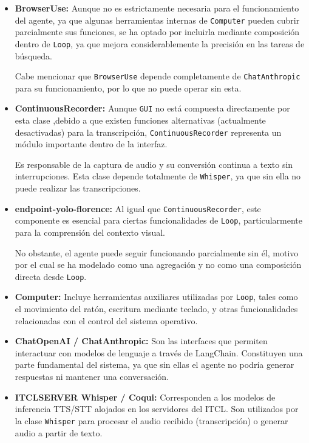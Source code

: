 \begin{itemize}
    \item \textbf{BrowserUse:} Aunque no es estrictamente necesaria para el funcionamiento del agente, ya que algunas herramientas internas de \texttt{Computer} pueden cubrir parcialmente sus funciones, se ha optado por incluirla mediante composición dentro de \texttt{Loop}, ya que mejora considerablemente la precisión en las tareas de búsqueda.
    
    Cabe mencionar que \texttt{BrowserUse} depende completamente de \texttt{ChatAnthropic} para su funcionamiento, por lo que no puede operar sin esta.

    \item \textbf{ContinuousRecorder:} Aunque \texttt{GUI} no está compuesta directamente por esta clase ,debido a que existen funciones alternativas (actualmente desactivadas) para la transcripción, \texttt{ContinuousRecorder} representa un módulo importante dentro de la interfaz.
    
    Es responsable de la captura de audio y su conversión continua a texto sin interrupciones. Esta clase depende totalmente de \texttt{Whisper}, ya que sin ella no puede realizar las transcripciones.

    \item \textbf{endpoint-yolo-florence:} Al igual que \texttt{ContinuousRecorder}, este componente es esencial para ciertas funcionalidades de \texttt{Loop}, particularmente para la comprensión del contexto visual.
    
    No obstante, el agente puede seguir funcionando parcialmente sin él, motivo por el cual se ha modelado como una agregación y no como una composición directa desde \texttt{Loop}.

    \item \textbf{Computer:} Incluye herramientas auxiliares utilizadas por \texttt{Loop}, tales como el movimiento del ratón, escritura mediante teclado, y otras funcionalidades relacionadas con el control del sistema operativo.

    \item \textbf{ChatOpenAI / ChatAnthropic:} Son las interfaces que permiten interactuar con modelos de lenguaje a través de LangChain. Constituyen una parte fundamental del sistema, ya que sin ellas el agente no podría generar respuestas ni mantener una conversación.

    \item \textbf{ITCLSERVER Whisper / Coqui:} Corresponden a los modelos de inferencia TTS/STT alojados en los servidores del ITCL. Son utilizados por la clase \texttt{Whisper} para procesar el audio recibido (transcripción) o generar audio a partir de texto.
    

\end{itemize}
